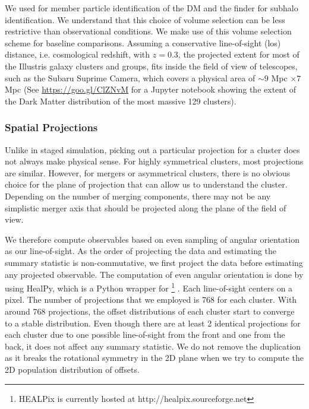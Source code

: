 We used {} for member particle identification of the DM and the 
{} finder for subhalo identification.
We understand that this choice of volume selection can be less restrictive than
observational conditions. We make use of this volume selection scheme
for baseline comparisons. Assuming a conservative line-of-sight (los) distance, 
i.e. cosmological redshift, with  $z = 0.3$, 
the projected extent for most of the Illustris galaxy clusters and groups, 
fits inside the field of view of telescopes, such as the Subaru Suprime Camera,
which covers a physical area of $\sim 9$ Mpc $\times 7$ Mpc 
(See \href{https://goo.gl/ClZNvM}{https://goo.gl/ClZNvM} for a Jupyter notebook 
showing the extent of the Dark Matter distribution of the most massive 129
clusters).

\subsubsection{Spatial Projections}
\label{subsubsec:projections}
Unlike in staged simulation, picking out a particular projection for a cluster 
does not always make physical sense.
For highly symmetrical clusters, most projections are similar. 
However, for mergers or asymmetrical clusters, 
there is no obvious choice for the plane of projection that can allow us to
understand the cluster. Depending on the number of merging components, there
may not be any simplistic merger axis that should be 
projected along the plane of the field of view. 

We therefore compute observables based on even sampling of angular orientation 
as our line-of-sight.
As the order of projecting the data and estimating the summary statistic is
non-commutative, we first project the data before estimating any projected 
observable. 
The computation of even angular orientation 
is done by using {\sc HealPy}, which is a {\sc Python} wrapper for
{} \footnote{HEALPix is
currently hosted at http://healpix.sourceforge.net}
\citep{Gorski2005}. Each line-of-sight centers on a {} 
pixel.
The number of projections that we employed is 768 for each cluster. With around 
768 projections, the offset distributions of each cluster start to converge to a
stable distribution. 
Even though there are at least 2 identical projections for each cluster due to
one possible line-of-sight from the front and one from the back, it does not
affect any summary statistic. We do not remove the duplication as it breaks
the rotational symmetry in the 2D plane when we try to compute the 2D population
distribution of offsets.  


